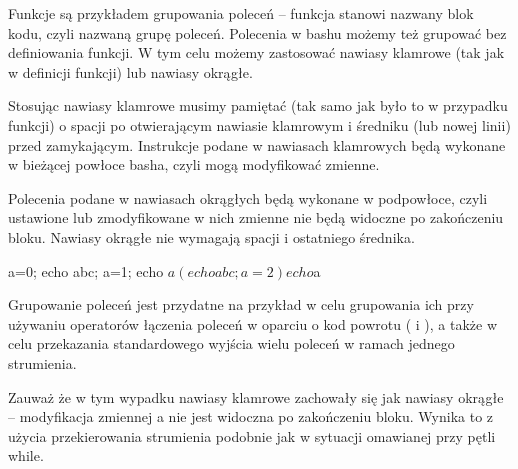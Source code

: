 Funkcje są przykładem grupowania poleceń – funkcja stanowi nazwany blok kodu, czyli nazwaną grupę poleceń.
Polecenia w bashu możemy też grupować bez definiowania funkcji.
W tym celu możemy zastosować nawiasy klamrowe (tak jak w definicji funkcji) lub nawiasy okrągłe.

Stosując nawiasy klamrowe musimy pamiętać (tak samo jak było to w przypadku funkcji)
	o spacji po otwierającym nawiasie klamrowym i średniku (lub nowej linii) przed zamykającym.
Instrukcje podane w nawiasach klamrowych będą wykonane w bieżącej powłoce basha, czyli mogą modyfikować zmienne.

Polecenia podane w nawiasach okrągłych będą wykonane w podpowłoce, czyli ustawione lub zmodyfikowane w nich zmienne nie będą widoczne po zakończeniu bloku. Nawiasy okrągłe nie wymagają spacji i ostatniego średnika.

\begin{CodeFrame*}[bash]{}
a=0;
{ echo abc; a=1; }
echo $a
(echo abc; a=2)
echo $a
\end{CodeFrame*}

Grupowanie poleceń jest przydatne na przykład w celu grupowania ich przy używaniu operatorów łączenia poleceń w oparciu o kod powrotu (\shell{&&} i \shell{||}), a także w celu przekazania standardowego wyjścia wielu poleceń w ramach jednego strumienia.


Zauważ że w tym wypadku nawiasy klamrowe zachowały się jak nawiasy okrągłe – modyfikacja zmiennej a nie jest widoczna po zakończeniu bloku. Wynika to z użycia przekierowania strumienia podobnie jak w sytuacji omawianej przy pętli while.
